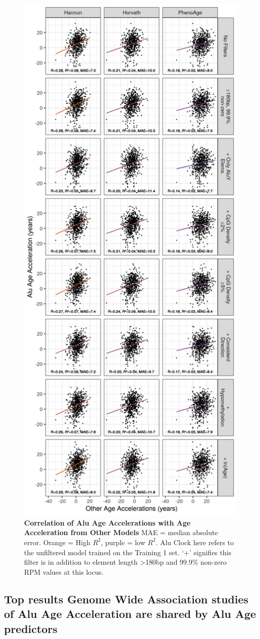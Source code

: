 \documentclass[
]{book}
\begin{document}
\begin{figure}

{\centering \includegraphics[width=0.6\linewidth]{./figs/alu_clock_accel_vs_others} 

}

\caption{\textbf{Correlation of Alu Age Accelerations with Age Acceleration from Other Models} MAE = median absolute error. Orange = High \(R^2\), purple = low \(R^2\). Alu Clock here refers to the unfiltered model trained on the Training 1 set. `+' signifies this filter is in addition to element length \textgreater180bp and 99.9\% non-zero RPM values at this locus.}\label{fig:aluClockAccelVsOthers}
\end{figure}



\hypertarget{top-results-genome-wide-association-studies-of-alu-age-acceleration-are-shared-by-alu-age-predictors}{%
\subsection{Top results Genome Wide Association studies of Alu Age Acceleration are shared by Alu Age predictors}\label{top-results-genome-wide-association-studies-of-alu-age-acceleration-are-shared-by-alu-age-predictors}}
\end{document}
